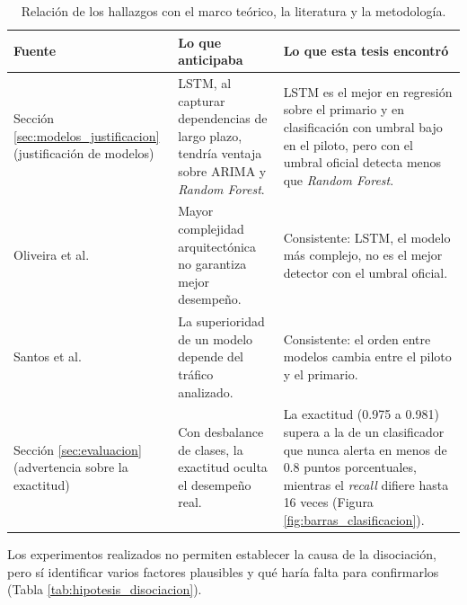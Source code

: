 \documentclass[12pt]{report}
\begin{document}
\begin{table}[H]
    \centering
    \small
    \begin{tabular}{|p{3.3cm}|p{5.2cm}|p{5.2cm}|}
        \hline
        \textbf{Fuente} & \textbf{Lo que anticipaba} & \textbf{Lo que esta tesis encontró} \\
        \hline
        Sección \ref{sec:modelos_justificacion} (justificación de modelos) & LSTM, al capturar dependencias de largo plazo, tendría ventaja sobre ARIMA y \textit{Random Forest}. & LSTM es el mejor en regresión sobre el primario y en clasificación con umbral bajo en el piloto, pero con el umbral oficial detecta menos que \textit{Random Forest}. \\
        \hline
        Oliveira et al. \cite{oliveira2016} & Mayor complejidad arquitectónica no garantiza mejor desempeño. & Consistente: LSTM, el modelo más complejo, no es el mejor detector con el umbral oficial. \\
        \hline
        Santos et al. \cite{santos2022} & La superioridad de un modelo depende del tráfico analizado. & Consistente: el orden entre modelos cambia entre el piloto y el primario. \\
        \hline
        Sección \ref{sec:evaluacion} (advertencia sobre la exactitud) & Con desbalance de clases, la exactitud oculta el desempeño real. & La exactitud (0.975 a 0.981) supera a la de un clasificador que nunca alerta en menos de 0.8 puntos porcentuales, mientras el \textit{recall} difiere hasta 16 veces (Figura \ref{fig:barras_clasificacion}). \\
        \hline
    \end{tabular}
    \caption{Relación de los hallazgos con el marco teórico, la literatura y la metodología.}
    \label{tab:reconciliacion_hallazgo}
\end{table}

Los experimentos realizados no permiten establecer la causa de la disociación, pero sí identificar varios factores plausibles y qué haría falta para confirmarlos (Tabla \ref{tab:hipotesis_disociacion}).
\end{document}
